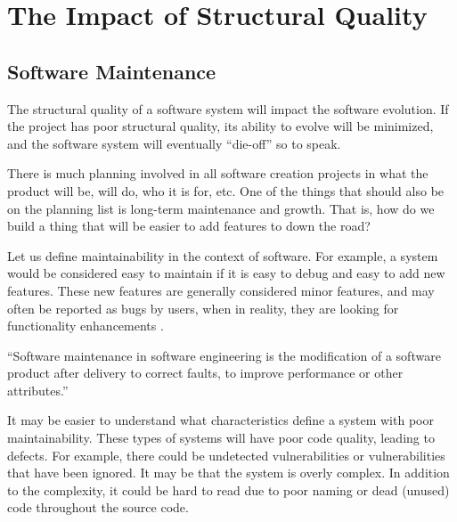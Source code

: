 
\section{The Impact of Structural Quality} \label{sectionMyIdea}

\subsection{Software Maintenance} \label{subSoftwareMaintenance}

The structural quality of a software system will impact the software evolution. If the project has poor structural quality, its ability to evolve will be minimized, and the software system will eventually ``die-off'' so to speak.

There is much planning involved in all software creation projects in what the product will be, will do, who it is for, etc. One of the things that should also be on the planning list is long-term maintenance and growth. That is, how do we build a thing that will be easier to add features to down the road?

Let us define maintainability in the context of software. For example, a system would be considered easy to maintain if it is easy to debug and easy to add new features. These new features are generally considered minor features, and may often be reported as bugs by users, when in reality, they are looking for functionality enhancements \cite{wiki:software-maintenance}.

\vspace{0.25cm}
\begin{displayquote}
``Software maintenance in software engineering is the modification of a software product after delivery to correct faults, to improve performance or other attributes.'' \cite{wiki:software-maintenance}
\end{displayquote}
\vspace{0.25cm}

It may be easier to understand what characteristics define a system with poor maintainability. These types of systems will have poor code quality, leading to defects. For example, there could be undetected vulnerabilities or vulnerabilities that have been ignored. It may be that the system is overly complex. In addition to the complexity, it could be hard to read due to poor naming or dead (unused) code throughout the source code.

